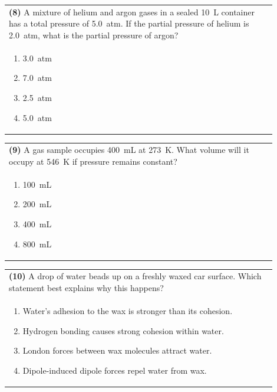 \documentclass{article}
\begin{document}
\vspace{0.2cm}
\noindent\begin{tabular}{|p{0.9\linewidth}|}
\hline
\textbf{(8)} A mixture of helium and argon gases in a sealed 10~L container has a total pressure of 5.0~atm. If the partial pressure of helium is 2.0~atm, what is the partial pressure of argon?\\[0.2cm]
\begin{minipage}[t]{0.85\linewidth}
\begin{enumerate}[label=\alph*.]
\item 3.0~atm
\item 7.0~atm
\item 2.5~atm
\item 5.0~atm
\end{enumerate}
\end{minipage}\\[0.2cm]
\hline
\end{tabular}
\newpage

\vspace{0.2cm}
\noindent\begin{tabular}{|p{0.9\linewidth}|}
\hline
\textbf{(9)} A gas sample occupies 400~mL at 273~K. What volume will it occupy at 546~K if pressure remains constant?\\[0.2cm]
\begin{minipage}[t]{0.85\linewidth}
\begin{enumerate}[label=\alph*.]
\item 100~mL
\item 200~mL
\item 400~mL
\item 800~mL
\end{enumerate}
\end{minipage}\\[0.2cm]
\hline
\end{tabular}

\noindent\begin{tabular}{|p{0.9\linewidth}|}
\hline
\textbf{(10)} A drop of water beads up on a freshly waxed car surface. Which statement best explains why this happens?\\[0.2cm]
\begin{minipage}[t]{0.85\linewidth}
\begin{enumerate}[label=\alph*.]
\item Water's adhesion to the wax is stronger than its cohesion.
\item Hydrogen bonding causes strong cohesion within water.
\item London forces between wax molecules attract water.
\item Dipole-induced dipole forces repel water from wax.
\end{enumerate}
\end{minipage}\\[0.2cm]
\hline
\end{tabular}
\end{document}
